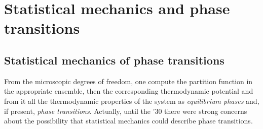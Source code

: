 \documentclass[../main/main.tex]{subfiles}
\begin{document}
\chapter{Statistical mechanics and phase transitions}


\section{Statistical mechanics of phase transitions}

From the microscopic degrees of freedom, one compute the partition function in the appropriate ensemble, then the corresponding thermodynamic potential and from it all the thermodynamic properties of the system as \emph{equilibrium phases} and, if present, \emph{phase transitions}. Actually, until the '30 there were strong concerns about the possibility that statistical mechanics could describe phase transitions.

\begin{figure}[h!]
\begin{minipage}[c]{0.5\linewidth}
\centering
{}
\end{minipage}
\begin{minipage}[]{0.5\linewidth}
\centering
{}
\end{minipage}
\caption{\label{fig:} }
\end{figure}
\end{document}
